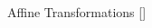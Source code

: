 \documentclass[10pt]{beamer}
\begin{document}
\begin{frame}{Affine Transformations \hfill \small [\cite{Carrazza:2018nmd}]}
\begin{columns}
\begin{column}{0.5 \textwidth}
\begin{figure}
\begin{center}
        \end{center}
      \end{figure}
        \end{column}
    \end{columns}

   
\end{frame}
\end{document}
